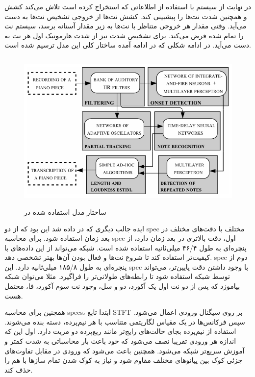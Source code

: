 در نهایت از سیستم با استفاده از اطلاعاتی که استخراج کرده است تلاش می‌کند کشش و
همچنین شدت نت‌ها را پیشبینی کند. کشش نت‌ها از خروجی تشخیص نت‌ها به دست می‌آید.
وقتی مقدار هر خروجی متناظر با نت‌ها به زیر مقدار آستانه برسد، سیستم نت را تمام
شده فرض می‌کند. برای تشخیص شدت نیز از شدت هارمونیک اول هر نت به دست می‌آید. در
ادامه شکلی که در ادامه آمده ساختار کلی این مدل ترسیم شده است.
\begin{figure}[ht]
    \centering
    \includegraphics[height=8cm]{./statics/marolt2004connectionist_architecture.png}
    \caption{ساختار مدل استفاده شده در \cite{marolt2004connectionist}}
\end{figure}

ایده جالب دیگری که در \cite{bock2012polyphonic} داده شد این بود که از دو
\gls{spec} مختلف با دقت‌های مختلف در بعد زمان استفاده شود. برای محاسبه
\gls{spec} اول، دقت بالاتری در بعد زمان دارد، از پنچره‌ای به طول ۴۶/۴ میلی‌ثانیه
استفاده شده است. شبکه می‌تواند از این داده‌های با کیفیت‌تر استفاده کند تا شروع
نت‌ها و فعال بودن آن‌ها بهتر تشخصی دهد. \gls{spec} دوم از پنجره‌ای به طول ۱۸۵/۸
میلی‌ثانیه دارد. این \gls{spec} با وجود داشتن دقت پایین‌تر، می‌تواند توسط شبکه
استفاده شود تا رابطه‌های طولانی‌تر را فراگیرد. مثلا می‌توان شبکه بیاموزد که پس
از دو نت اول یک آکورد، دو و سل، وجود نت سوم آکورد، فا، محتمل هست.

همچنین برای محاسبه \glspl{spec}، ابتدا تابع \gls{STFT} بر روی سیگنال ورودی اعمال
می‌شود. سپس فرکانس‌ها در یک مقیاس لگاریتمی متناسب با هر نیم‌پرده، دسته بنده
می‌شوند. استفاده از نیم‌پرده بجای حالت‌های رایج‌تر مانند ربع‌پرده دو مزیت دارد.
اول این که اندازه هر ورودی تقریبا نصف می‌شود که خود باعث بار محاسباتی به شدت
کمتر و آموزش سریع‌تر شبکه می‌شود. همچنین باعث می‌شود که ورودی در مقابل تفاوت‌های
جزئی کوک بین پیانو‌های مختلف مقاوم شود و نیاز به کوک شدن تمام سازها با هم را حذف
کند.

